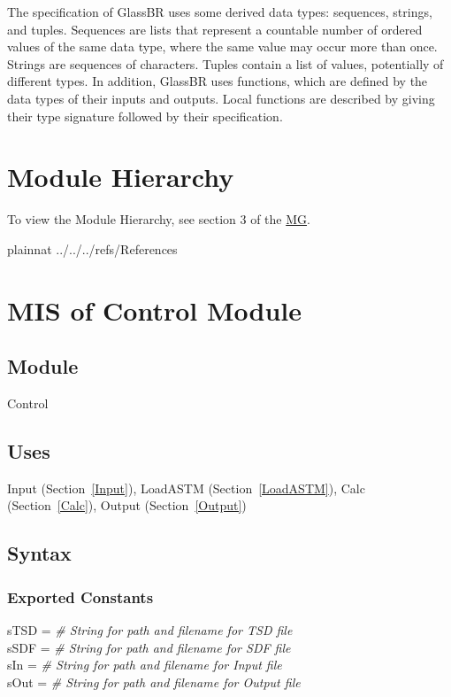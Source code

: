 \documentclass[12pt, titlepage]{article}
\newcommand{\progname}{GlassBR}
\begin{document}
\noindent
The specification of \progname{} uses some derived data types: sequences, strings, and
tuples. Sequences are lists that represent a countable number of ordered values of the same data type, where 
the same value may occur more than once. Strings are sequences of characters. 
Tuples contain a list of values, potentially of different types. 
In addition, \progname{} uses functions, which
are defined by the data types of their inputs and outputs. Local functions are
described by giving their type signature followed by their specification.

\section{Module Hierarchy} 

To view the Module Hierarchy, see section 3 of the \href{../MG/glassbr_mg.pdf}{MG}.

 {plainnat}
 {../../../refs/References}

\newpage


\section{MIS of Control Module} \label{Main}

\subsection{Module}

Control

\subsection{Uses}

Input (Section~\ref{Input}), LoadASTM (Section~\ref{LoadASTM}), Calc
(Section~\ref{Calc}), Output (Section~\ref{Output})

\subsection{Syntax}

\subsubsection {Exported Constants}

sTSD = \textit{\# String for path and filename for TSD file}\\
sSDF = \textit{\# String for path and filename for SDF file}\\
sIn = \textit{\# String for path and filename for Input file}\\
sOut = \textit{\# String for path and filename for Output file}
\end{document}
